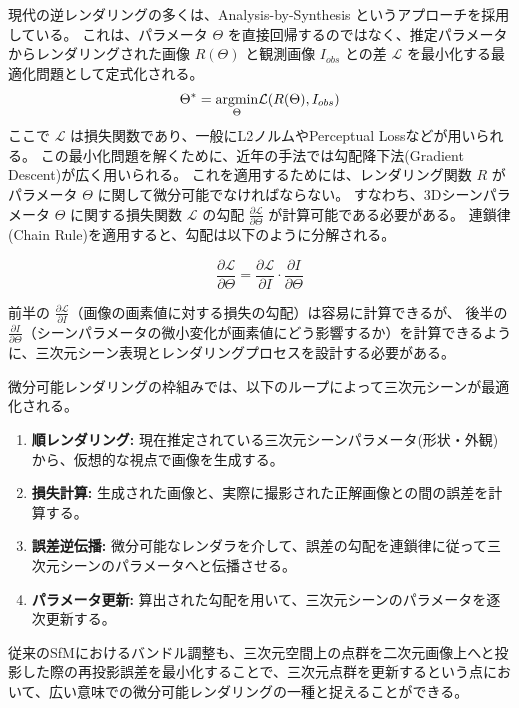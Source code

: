 現代の逆レンダリングの多くは、Analysis-by-Synthesis というアプローチを採用している。
これは、パラメータ $\Theta$ を直接回帰するのではなく、推定パラメータからレンダリングされた画像 $R(\Theta)$ と観測画像 $I_{obs}$ との差 $\mathcal{L}$ を最小化する最適化問題として定式化される。
\begin{equation}\label{eq:analysis-by-synthesis}
    \Theta^* = \underset{\Theta}{\text{argmin}} \space \mathcal{L}(R(\Theta), I_{obs})
\end{equation}
ここで $\mathcal{L}$ は損失関数であり、一般にL2ノルムやPerceptual Lossなどが用いられる。
この最小化問題を解くために、近年の手法では勾配降下法(Gradient Descent)が広く用いられる。
これを適用するためには、レンダリング関数 $R$ がパラメータ $\Theta$ に関して微分可能でなければならない。
すなわち、3Dシーンパラメータ $\Theta$ に関する損失関数 $\mathcal{L}$ の勾配 $\frac{\partial \mathcal{L}}{\partial \Theta}$ が計算可能である必要がある。
連鎖律(Chain Rule)を適用すると、勾配は以下のように分解される。

\begin{equation}\label{eq:chain-rule-of-DR}
    \frac{\partial \mathcal{L}}{\partial \Theta} = \frac{\partial \mathcal{L}}{\partial I} \cdot \frac{\partial I}{\partial \Theta}
\end{equation}

前半の $\frac{\partial \mathcal{L}}{\partial I}$（画像の画素値に対する損失の勾配）は容易に計算できるが、
後半の $\frac{\partial I}{\partial \Theta}$（シーンパラメータの微小変化が画素値にどう影響するか）を計算できるように、三次元シーン表現とレンダリングプロセスを設計する必要がある。

微分可能レンダリングの枠組みでは、以下のループによって三次元シーンが最適化される。

\begin{enumerate}
    \item \textbf{順レンダリング:} 現在推定されている三次元シーンパラメータ(形状・外観)から、仮想的な視点で画像を生成する。
    \item \textbf{損失計算:} 生成された画像と、実際に撮影された正解画像との間の誤差を計算する。
    \item \textbf{誤差逆伝播:} 微分可能なレンダラを介して、誤差の勾配を連鎖律に従って三次元シーンのパラメータへと伝播させる。
    \item \textbf{パラメータ更新:} 算出された勾配を用いて、三次元シーンのパラメータを逐次更新する。
\end{enumerate}

従来のSfMにおけるバンドル調整も、三次元空間上の点群を二次元画像上へと投影した際の再投影誤差を最小化することで、三次元点群を更新するという点において、広い意味での微分可能レンダリングの一種と捉えることができる。


